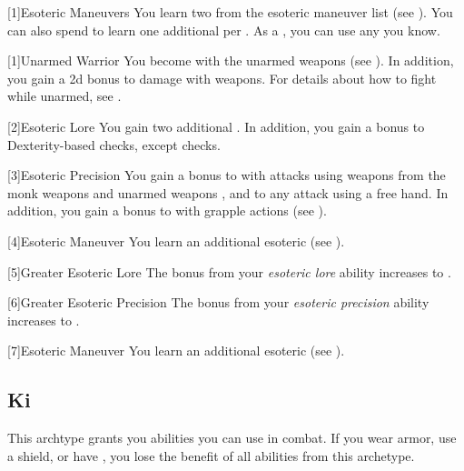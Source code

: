         [1]{Esoteric Maneuvers} 
        You learn two  from the esoteric maneuver list (see ).
        You can also spend  to learn one additional  per .
        As a , you can use any  you know.

        [1]{Unarmed Warrior} You become  with the unarmed weapons  (see ).
        In addition, you gain a \plus2d bonus to damage with  weapons.
        For details about how to fight while unarmed, see .

        [2]{Esoteric Lore} You gain two additional .
        In addition, you gain a  bonus to Dexterity-based checks, except  checks.

        [3]{Esoteric Precision} You gain a  bonus to  with attacks using weapons from the monk weapons and unarmed weapons , and to any attack using a free hand.
        In addition, you gain a  bonus to  with grapple actions (see ).




        [4]{Esoteric Maneuver} You learn an additional esoteric  (see ).

        [5]{Greater Esoteric Lore} The bonus from your \textit{esoteric lore} ability increases to .

        [6]{Greater Esoteric Precision} The bonus from your \textit{esoteric precision} ability increases to .

        [7]{Esoteric Maneuver} You learn an additional esoteric  (see ).

    \subsection{Ki}
        This archtype grants you abilities you can use in combat.
        If you wear armor, use a shield, or have , you lose the benefit of all abilities from this archetype.

